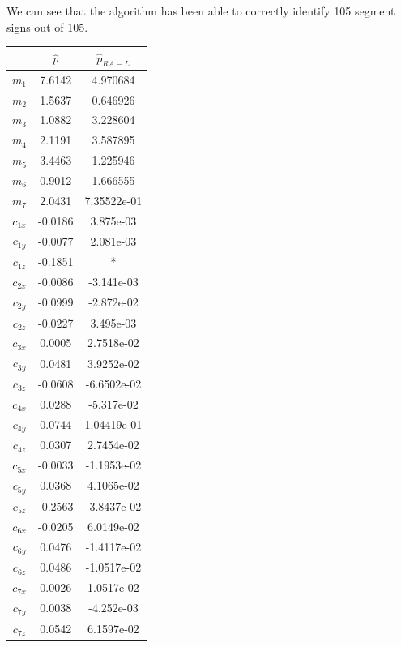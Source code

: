 \documentclass{article}
\begin{document}
We can see that the algorithm has been able to correctly identify 105 segment signs out of 105.

\clearpage

\begin{table}
\begin{center}
\begin{tabular}{|c|cc|}
\hline
& $\hat{p}$ & $\hat{p}_{RA-L}$\\ 
\hline
$ m_1 $ & 7.6142 & 4.970684\\
$ m_2 $ & 1.5637 & 0.646926\\
$ m_3 $ & 1.0882 & 3.228604\\
$ m_4 $ & 2.1191 & 3.587895\\
$ m_5 $ & 3.4463 & 1.225946\\
$ m_6 $ & 0.9012 & 1.666555\\
$ m_7 $ & 2.0431 & 7.35522e-01\\
$ c_{1x} $ & -0.0186 & 3.875e-03\\
$ c_{1y} $ & -0.0077 & 2.081e-03\\
$ c_{1z} $ & -0.1851 & *\\
$ c_{2x} $ & -0.0086 & -3.141e-03\\
$ c_{2y} $ & -0.0999 & -2.872e-02\\
$ c_{2z} $ & -0.0227 & 3.495e-03\\
$ c_{3x} $ & 0.0005 & 2.7518e-02\\
$ c_{3y} $ & 0.0481 & 3.9252e-02\\
$ c_{3z} $ & -0.0608 & -6.6502e-02\\
$ c_{4x} $ & 0.0288 & -5.317e-02\\
$ c_{4y} $ & 0.0744 & 1.04419e-01\\
$ c_{4z} $ & 0.0307 & 2.7454e-02\\
$ c_{5x} $ & -0.0033 & -1.1953e-02\\
$ c_{5y} $ & 0.0368 & 4.1065e-02\\
$ c_{5z} $ & -0.2563 & -3.8437e-02\\
$ c_{6x} $ & -0.0205 & 6.0149e-02\\
$ c_{6y} $ & 0.0476 & -1.4117e-02\\
$ c_{6z} $ & 0.0486 & -1.0517e-02\\
$ c_{7x} $ & 0.0026 & 1.0517e-02\\
$ c_{7y} $ & 0.0038 & -4.252e-03\\
$ c_{7z} $ & 0.0542 & 6.1597e-02\\
\hline
\end{tabular}
\hspace{1cm}

\end{center}
\end{table}
\end{document}
